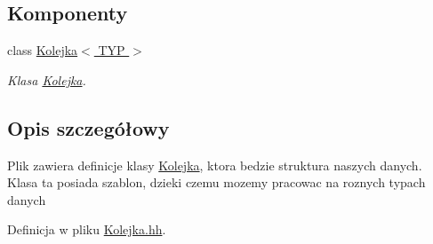 \subsection*{Komponenty}
\begin{DoxyCompactItemize}
\item 
class \hyperlink{class_kolejka}{Kolejka$<$ TYP $>$}
\begin{DoxyCompactList}\small\item\em Klasa \hyperlink{class_kolejka}{Kolejka}. \item\end{DoxyCompactList}\end{DoxyCompactItemize}


\subsection{Opis szczegółowy}
Plik zawiera definicje klasy \hyperlink{class_kolejka}{Kolejka}, ktora bedzie struktura naszych danych. Klasa ta posiada szablon, dzieki czemu mozemy pracowac na roznych typach danych 

Definicja w pliku \hyperlink{_kolejka_8hh_source}{Kolejka.hh}.

